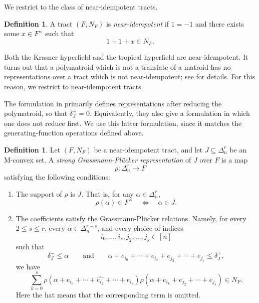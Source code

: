 \documentclass[11pt]{article}
\theoremstyle{definition}
\newtheorem{definition}[theorem]{Definition}
\theoremstyle{remark}
\newcommand{\dnr}{\Delta_n^r}
\newcommand{\delplus}{\delta_J^+}
\newcommand{\delminus}{\delta_J^-}
\begin{document}
We restrict to the class of near-idempotent tracts.

\begin{definition}
    A tract $(F,N_F)$ is \emph{near-idempotent} if $1=-1$ and there exists some $x\in F^\times$ such that
    \[
        1+1+x\in N_F.
    \]
\end{definition}

Both the Krasner hyperfield and the tropical hyperfield are near-idempotent. It turns out that a polymatroid which is not a translate of a matroid has no representations over a tract which is not near-idempotent; see \cite{baker2025representationtheorypolymatroids} for details. For this reason, we restrict to near-idempotent tracts.

The formulation in \cite{baker2025representationtheorypolymatroids} primarily defines representations after reducing the polymatroid, so that $\delminus=0$. Equivalently, they also give a formulation in which one does not reduce first. We use this latter formulation, since it matches the generating-function operations defined above.

\begin{definition}\label{definition:strong_GP_representation}
    Let $(F,N_F)$ be a near-idempotent tract, and let $J\subseteq\dnr$ be an M-convex set. A \emph{strong Grassmann-Pl\"ucker representation} of $J$ over $F$ is a map
    \[
        \rho\colon\dnr\to F
    \]
    satisfying the following conditions:
    \begin{enumerate}
        \item The support of $\rho$ is $J$. That is, for any $\alpha\in\dnr$,
        \[
            \rho(\alpha)\in F^\times
            \quad\Longleftrightarrow\quad
            \alpha\in J.
        \]

                \item The coefficients satisfy the Grassmann-Pl\"ucker relations. Namely, for every $2\leq s\leq r$, every $\alpha\in\Delta_n^{r-s}$, and every choice of indices
        \[
            i_0,\dots,i_s,j_2,\dots,j_s\in[n]
        \]
        such that
        \[
            \delminus\leq\alpha
            \qquad\text{and}\qquad
            \alpha+e_{i_0}+\cdots+e_{i_s}+e_{j_2}+\cdots+e_{j_s}\leq\delplus,
        \]
        we have
        \[
            \sum_{k=0}^s
            \rho(\alpha+e_{i_0}+\cdots+\widehat{e_{i_k}}+\cdots+e_{i_s})
            \rho(\alpha+e_{i_k}+e_{j_2}+\cdots+e_{j_s})
            \in N_F.
        \]
        Here the hat means that the corresponding term is omitted.
    \end{enumerate}
\end{definition}
\end{document}
